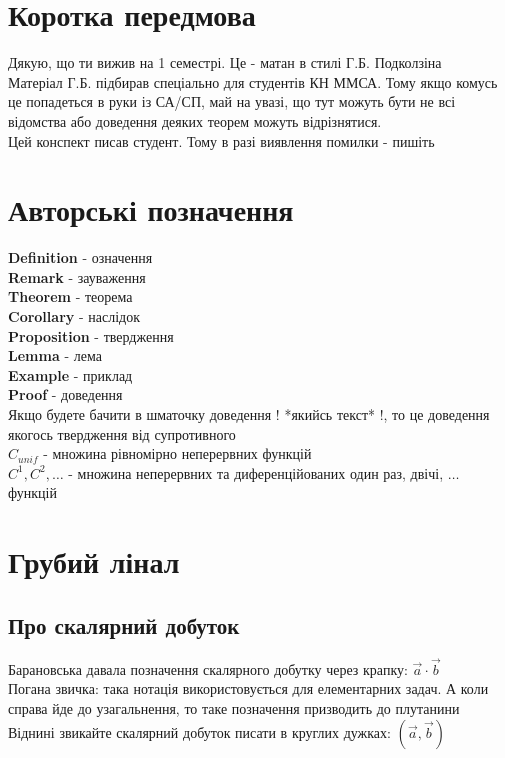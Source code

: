 \documentclass[a4paper, 14pt]{extarticle}
\def\bigline{\vspace{5mm}\\}
\theoremstyle{theoremdd}
\theoremstyle{theoremdd}
\theoremstyle{theoremdd}
\theoremstyle{theoremdd}
\theoremstyle{theoremdd}
\theoremstyle{theoremdd}
\theoremstyle{theoremdd}
\theoremstyle{theoremdd}
\begin{document}


\tableofcontents
\newpage

\section*{Коротка передмова}
Дякую, що ти вижив на 1 семестрі. Це - матан в стилі Г.Б. Подколзіна
\bigline
Матеріал Г.Б. підбирав спеціально для студентів КН ММСА. Тому якщо комусь це попадеться в руки із СА/СП, май на увазі, що тут можуть бути не всі відомства або доведення деяких теорем можуть відрізнятися.
\bigline
Цей конспект писав студент. Тому в разі виявлення помилки - пишіть
\newpage

\section*{Авторські позначення}
\textbf{Definition} - означення\\
\textbf{Remark} - зауваження\\
\textbf{Theorem} - теорема\\
\textbf{Corollary} - наслідок\\
\textbf{Proposition} - твердження\\
\textbf{Lemma} - лема\\
\textbf{Example} - приклад
\bigline
\textbf{Proof} - доведення\\
Якщо будете бачити в шматочку доведення ! *якийсь текст* !, то це доведення якогось твердження від супротивного
\bigline
$C_{unif}$ - множина рівномірно неперервних функцій\\
$C^1, C^2, \dots$ - множина неперервних та диференційованих один раз, двічі, $\dots$ функцій

\newpage

\section*{Грубий лінал}
\subsection*{Про скалярний добуток}
Барановська давала позначення скалярного добутку через крапку: $\vec{a} \cdot \vec{b}$\\
Погана звичка: така нотація використовується для елементарних задач. А коли справа йде до узагальнення, то таке позначення призводить до плутанини\\
Віднині звикайте скалярний добуток писати в круглих дужках: $(\vec{a}, \vec{b})$
\end{document}
